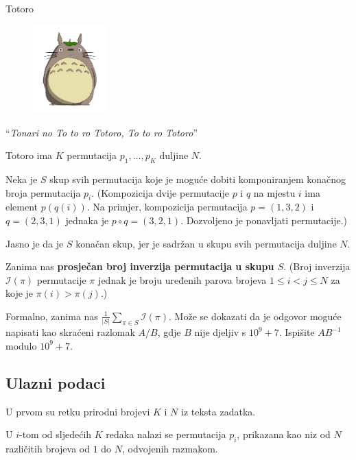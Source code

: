 \begin{statement}[
  problempoints=100,
  timelimit=1 sekunda,
  memorylimit=512 MiB,
]{Totoro}

\setlength\intextsep{-0.1cm}
\begin{figure}
\centering
\includegraphics[width=0.25\textwidth]{img/totoro.png}
\end{figure}

``\textit{Tonari no To to ro Totoro, To to ro Totoro}'' 

Totoro ima $K$ permutacija $p_1, \ldots, p_K$ duljine $N$.

Neka je $S$ skup svih permutacija koje je moguće
dobiti komponiranjem konačnog broja permutacija $p_i$. 
(Kompozicija dvije permutacije $p$ i $q$ 
na mjestu $i$ ima element $p(q(i))$. Na primjer, 
kompozicija permutacija $p = (1, 3, 2)$
i $q = (2, 3, 1)$ jednaka je $p \circ q = (3, 2, 1)$. 
Dozvoljeno je ponavljati permutacije.)

Jasno je da je $S$ konačan skup, jer je sadržan u skupu svih
permutacija duljine $N$.

Zanima nas \textbf{prosječan broj inverzija permutacija u skupu $S$}.
(Broj inverzija $\mathcal{I}(\pi)$ permutacije $\pi$ 
jednak je broju uređenih parova
brojeva $1 \le i < j \le N$ za koje je $\pi(i) > \pi(j)$.)

Formalno, zanima nas $\frac{1}{|S|} \sum_{\pi \in S} \mathcal{I} (\pi)$.
Može se dokazati da je odgovor moguće napisati
kao skraćeni razlomak $A/B$, gdje $B$ nije djeljiv s $10^9 + 7$. 
Ispišite $AB^{-1}$ modulo $10^9 + 7$.

\subsection*{Ulazni podaci}
U prvom su retku prirodni brojevi $K$ i $N$ iz teksta zadatka.

U $i$-tom od sljedećih $K$ redaka nalazi se permutacija $p_i$, 
prikazana kao niz od $N$ različitih brojeva od $1$ do $N$, odvojenih razmakom.


\end{statement}
